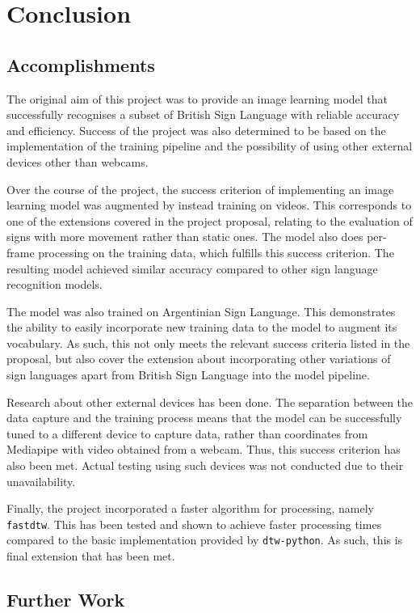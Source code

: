 \documentclass[final,rdr32.tex]{subfiles}
\begin{document}
\chapter{Conclusion}

\section{Accomplishments}

The original aim of this project was to provide an image learning model that successfully recognises a subset of British Sign Language with reliable accuracy and efficiency. Success of the project was also determined to be based on the implementation of the training pipeline and the possibility of using other external devices other than webcams.

Over the course of the project, the success criterion of implementing an image learning model was augmented by instead training on videos. This corresponds to one of the extensions covered in the project proposal, relating to the evaluation of signs with more movement rather than static ones. The model also does per-frame processing on the training data, which fulfills this success criterion. The resulting model achieved similar accuracy compared to other sign language recognition models.

The model was also trained on Argentinian Sign Language. This demonstrates the ability to easily incorporate new training data to the model to augment its vocabulary. As such, this not only meets the relevant success criteria listed in the proposal, but also cover the extension about incorporating other variations of sign languages apart from British Sign Language into the model pipeline.

Research about other external devices has been done. The separation between the data capture and the training process means that the model can be successfully tuned to a different device to capture data, rather than coordinates from Mediapipe with video obtained from a webcam. Thus, this success criterion has also been met. Actual testing using such devices was not conducted due to their unavailability.

Finally, the project incorporated a faster algorithm for processing, namely \verb|fastdtw|. This has been tested and shown to achieve faster processing times compared to the basic implementation provided by \verb|dtw-python|. As such, this is final extension that has been met.


\section{Further Work}
\end{document}
